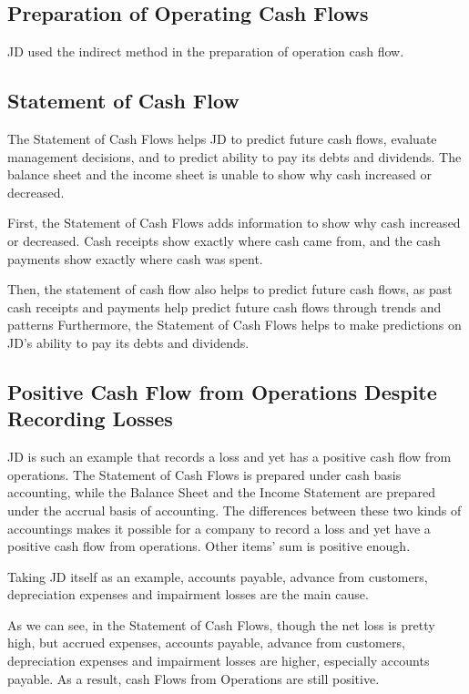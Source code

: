 \subsection{Preparation of Operating Cash Flows}
JD used the indirect method in the preparation of operation cash flow.

\subsection{Statement of Cash Flow}
The Statement of Cash Flows helps JD to predict future cash flows, evaluate management decisions, and to predict ability to pay its debts and dividends. The balance sheet and the income sheet is unable to show why cash increased or decreased.   

First, the Statement of Cash Flows adds information to show why cash increased or decreased. Cash receipts show exactly where cash came from, and the cash payments show exactly where cash was spent. 

Then, the statement of cash flow also helps to predict future cash flows, as past cash receipts and payments help predict future cash flows through trends and patterns
Furthermore, the Statement of Cash Flows helps to make predictions on JD’s ability to pay its debts and dividends. 

\subsection{Positive Cash Flow from Operations Despite Recording Losses}
JD is such an example that records a loss and yet has a positive cash flow from operations. The Statement of Cash Flows is prepared under cash basis accounting, while the Balance Sheet and the Income Statement are prepared under the accrual basis of accounting. The differences between these two kinds of accountings makes it possible for a company to record a loss and yet have a positive cash flow from operations. Other items’ sum is positive enough.

Taking JD itself as an example, accounts payable, advance from customers, depreciation expenses and impairment losses are the main cause. 

As we can see, in the Statement of Cash Flows, though the net loss is pretty high, but accrued expenses, accounts payable, advance from customers, depreciation expenses and impairment losses are higher, especially accounts payable. As a result, cash Flows from Operations are still positive.

